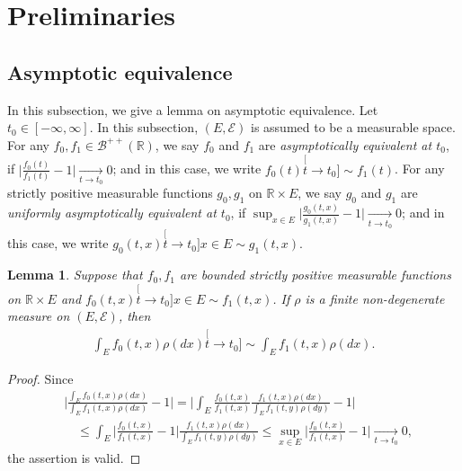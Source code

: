 \documentclass[12pt,a4paper]{amsart}
\newtheorem{lem}[thm]{Lemma}
\theoremstyle{definition}
\numberwithin{equation}{section}
\begin{document}
\section{Preliminaries} 
\label{sec: Preliminaries}
\subsection{Asymptotic equivalence} 
\label{sec: Asymptotic equivalence}
In this subsection, we give a lemma on asymptotic equivalence.	
Let $t_0 \in [-\infty,\infty]$.
In this subsection, $(E, \mathscr E)$ is assumed to be a  measurable space.
For any $f_0, f_1\in \mathscr B^{++}({\mathbb R})$, we say $f_0$ and $f_1$ are \emph{asymptotically equivalent at $t_0$}, if $\big|\frac{f_0(t)}{f_1(t)} - 1\big| \xrightarrow[t\to t_0]{} 0$;
and in this case, we write $f_0(t) \stackrel[t\to t_0]{}{\sim} f_1(t)$.
For any strictly positive measurable functions $g_0, g_1$ on $\mathbb R\times E$, we say $g_0$ and $g_1$ are \emph{uniformly asymptotically equivalent at $t_0$}, if $\sup_{x\in E}\big|\frac{g_0(t,x)}{g_1(t,x)} - 1\big| \xrightarrow[t\to t_0]{} 0$; and in this case, we write $g_0(t,x)\stackrel[t\to t_0]{x\in E}{\sim}g_1(t,x)$.

\begin{lem} \label{lem: asymptotic equivalent of integration}
	Suppose that $f_0,f_1$ are bounded strictly positive measurable functions on $\mathbb R \times E$ and $f_0(t,x)\stackrel[t\to t_0]{x\in E}{\sim}f_1(t,x)$.
  If $\rho$ is a finite non-degenerate measure on $(E, \mathscr E)$, then
  \begin{align}
    \int_E f_0(t,x)\rho(dx)
    \stackrel[t\to t_0]{}{\sim}
    \int_E f_1(t,x)\rho(dx).
  \end{align}
\end{lem}
\begin{proof}
	Since
\begin{align}
	&\Big| \frac{	\int_E f_0(t,x) \rho(dx) }{ 	\int_E f_1(t,x) \rho(dx)  } - 1 \Big|
   = \Big| \int_E \frac{f_0(t,x)}{f_1(t,x)} \frac{f_1(t,x) \rho(dx)}{	\int_E f_1(t,y) \rho(dy)  } - 1\Big|
	\\&\quad \leq \int_E \Big|  \frac{f_0(t,x)}{f_1(t,x)} - 1 \Big| \frac{f_1(t,x) \rho(dx)}{	\int_E f_1(t,y) \rho(dy)  }
	\leq \sup_{x\in E} \Big|  \frac {f_0(t,x)} {f_1(t,x)} - 1 \Big|
	\xrightarrow[t\to t_0]{} 0,
\end{align}
the assertion is valid.
\end{proof}
\end{document}
